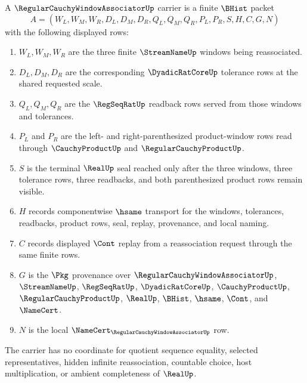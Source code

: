 \begin{definition}
\label{def:regular-cauchy-window-associator-carrier}
A $\RegularCauchyWindowAssociatorUp$ carrier is a finite $\BHist$ packet
$$
A=(W_L,W_M,W_R,D_L,D_M,D_R,Q_L,Q_M,Q_R,P_L,P_R,S,H,C,G,N)
$$
with the following displayed rows:
\begin{enumerate}
\item $W_L,W_M,W_R$ are the three finite $\StreamNameUp$ windows being reassociated.
\item $D_L,D_M,D_R$ are the corresponding $\DyadicRatCoreUp$ tolerance rows at the shared requested scale.
\item $Q_L,Q_M,Q_R$ are the $\RegSeqRatUp$ readback rows served from those windows and tolerances.
\item $P_L$ and $P_R$ are the left- and right-parenthesized product-window rows read through $\CauchyProductUp$ and $\RegularCauchyProductUp$.
\item $S$ is the terminal $\RealUp$ seal reached only after the three windows, three tolerance rows, three readbacks, and both parenthesized product rows remain visible.
\item $H$ records componentwise $\hsame$ transport for the windows, tolerances, readbacks, product rows, seal, replay, provenance, and local naming.
\item $C$ records displayed $\Cont$ replay from a reassociation request through the same finite rows.
\item $G$ is the $\Pkg$ provenance over $\RegularCauchyWindowAssociatorUp$, $\StreamNameUp$, $\RegSeqRatUp$, $\DyadicRatCoreUp$, $\CauchyProductUp$, $\RegularCauchyProductUp$, $\RealUp$, $\BHist$, $\hsame$, $\Cont$, and $\NameCert$.
\item $N$ is the local $\NameCert_{\RegularCauchyWindowAssociatorUp}$ row.
\end{enumerate}
The carrier has no coordinate for quotient sequence equality, selected representatives, hidden infinite reassociation, countable choice, host multiplication, or ambient completeness of $\RealUp$.
\end{definition}

